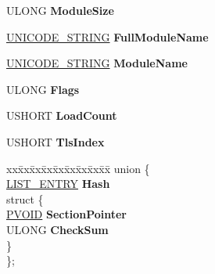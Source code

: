 \begin{DoxyCompactItemize}
U\+L\+O\+NG {\bfseries Module\+Size}
\item 
\mbox{\label{struct___l_d_r___d_a_t_a___t_a_b_l_e___e_n_t_r_y_a00ee4d598f61ad568fc347c83d79bcfd}} 
\hyperlink{struct___u_n_i_c_o_d_e___s_t_r_i_n_g}{U\+N\+I\+C\+O\+D\+E\+\_\+\+S\+T\+R\+I\+NG} {\bfseries Full\+Module\+Name}
\item 
\mbox{\label{struct___l_d_r___d_a_t_a___t_a_b_l_e___e_n_t_r_y_ad97a8a274f9680ab53559503fa3f5c8f}} 
\hyperlink{struct___u_n_i_c_o_d_e___s_t_r_i_n_g}{U\+N\+I\+C\+O\+D\+E\+\_\+\+S\+T\+R\+I\+NG} {\bfseries Module\+Name}
\item 
\mbox{\label{struct___l_d_r___d_a_t_a___t_a_b_l_e___e_n_t_r_y_a5e68353a301bbe93b0ae307c8865a2f6}} 
U\+L\+O\+NG {\bfseries Flags}
\item 
\mbox{\label{struct___l_d_r___d_a_t_a___t_a_b_l_e___e_n_t_r_y_a1c82c76c94dca8f269dfd81d651b95c9}} 
U\+S\+H\+O\+RT {\bfseries Load\+Count}
\item 
\mbox{\label{struct___l_d_r___d_a_t_a___t_a_b_l_e___e_n_t_r_y_a5a4ef8ac4681d81c8dee12086c267ec4}} 
U\+S\+H\+O\+RT {\bfseries Tls\+Index}
\item 
\mbox{\label{struct___l_d_r___d_a_t_a___t_a_b_l_e___e_n_t_r_y_acbe38f079c46e064945e489ef3c392c8}} 
\begin{tabbing}
xx\=xx\=xx\=xx\=xx\=xx\=xx\=xx\=xx\=\kill
union \{\\
\>\hyperlink{struct___l_i_s_t___e_n_t_r_y}{LIST\_ENTRY} {\bfseries Hash}\\
\mbox{\label{union___l_d_r___d_a_t_a___t_a_b_l_e___e_n_t_r_y_1_1_0D1080_ae1f4539e0518986e33aa8a2b4d5576e7}} 
\>struct \{\\
\>\>\hyperlink{interfacevoid}{PVOID} {\bfseries SectionPointer}\\
\>\>ULONG {\bfseries CheckSum}\\
\>\} \\
\}; \\


\end{tabbing}
\end{DoxyCompactItemize}
